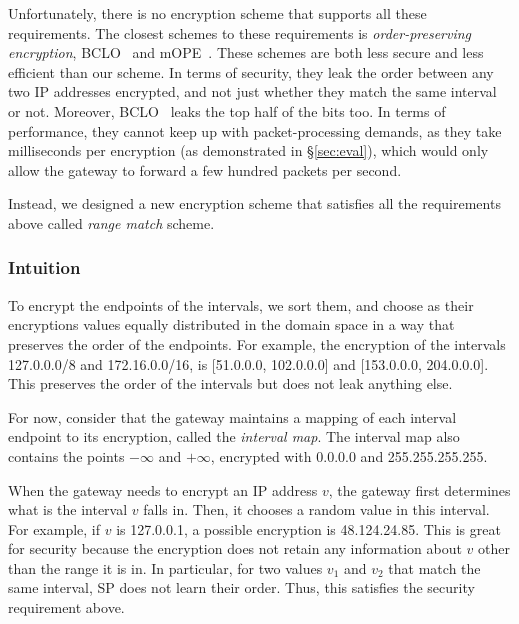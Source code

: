 

Unfortunately, there is no encryption scheme that supports all these requirements. The closest schemes to these requirements  is {\em order-preserving encryption}, BCLO~\cite{boldyreva:ope} and mOPE~\cite{popa:mope}. These schemes are both less secure and less efficient than our scheme. In terms of security, they leak the order between any two IP addresses encrypted, and not just whether they match the same interval or not. Moreover, BCLO~\cite{boldyreva:ope} leaks the top half of the bits too. In terms of performance, they cannot keep up with packet-processing demands, as they take milliseconds per encryption (as demonstrated in \S\ref{sec:eval}), which would only allow the gateway to forward a few hundred packets per second. 


Instead, we designed a new encryption scheme that satisfies all the requirements above called {\em range match} scheme. 

\subsubsection{Intuition} 




To encrypt the endpoints of the intervals, we sort them, and choose as their encryptions values equally distributed in the domain space in a way that preserves the order of the endpoints. For example, the encryption of the intervals 127.0.0.0/8 and 172.16.0.0/16, is [51.0.0.0, 102.0.0.0] and [153.0.0.0, 204.0.0.0]. This preserves the order of the intervals but does not leak anything else.

For now, consider that the gateway  maintains a mapping of each interval endpoint  to its encryption, called the {\em interval map}.  The interval map also contains the points $- \infty$ and $+ \infty$, encrypted with 0.0.0.0 and 255.255.255.255. 


When the gateway needs to encrypt an IP address $v$, the gateway first determines what  is the interval  $v$ falls in. %
 Then, %
 it chooses a random value in this interval.
For example, if $v$ is 127.0.0.1, a possible encryption is 48.124.24.85. This is great for security because the encryption does not retain any information about $v$ other than the range it is in. In particular, for two values $v_1$ and $v_2$ that match the same interval, SP does not learn their order. Thus, this satisfies the security requirement above. %


